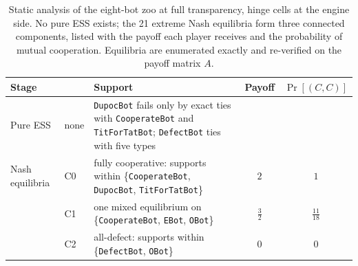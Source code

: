 \begin{table}[t]\centering\small
\begin{tabular}{@{}llp{}cc@{}}\toprule
Stage & & Support & Payoff & $\Pr[(C,C)]$ \\\midrule
Pure ESS & none & \texttt{DupocBot} fails only by exact ties with \texttt{CooperateBot} and \texttt{TitForTatBot}; \texttt{DefectBot} ties with five types & & \\\midrule
Nash equilibria & C0 & fully cooperative: supports within \{\texttt{CooperateBot}, \texttt{DupocBot}, \texttt{TitForTatBot}\} & $2$ & $1$ \\
 & C1 & one mixed equilibrium on \{\texttt{CooperateBot}, \texttt{EBot}, \texttt{OBot}\} & $\tfrac32$ & $\tfrac{11}{18}$ \\
 & C2 & all-defect: supports within \{\texttt{DefectBot}, \texttt{OBot}\} & $0$ & $0$ \\\bottomrule
\end{tabular}
\caption{Static analysis of the eight-bot zoo at full transparency, hinge cells at the engine side. No pure ESS exists; the 21 extreme Nash equilibria form three connected components, listed with the payoff each player receives and the probability of mutual cooperation. Equilibria are enumerated exactly and re-verified on the payoff matrix $A$.}
\label{tab:statics-body}
\end{table}
